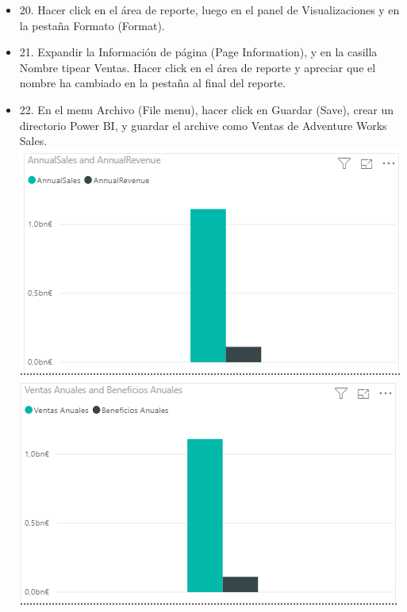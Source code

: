\begin{itemize}
\item 20. Hacer click en el área de reporte, luego en el panel de Visualizaciones y en la pestaña Formato (Format). \\
\item 21. Expandir la Información de página (Page Information), y en la casilla Nombre tipear Ventas. Hacer click en el área de reporte y apreciar que el nombre ha cambiado en la pestaña al final del reporte. \\


\item 22. En el menu Archivo (File menu), hacer click en Guardar (Save), crear un directorio Power BI, y guardar el archive como Ventas de Adventure Works Sales. \\

\includegraphics[scale=0.5]{./Imagenes/image029}
\includegraphics[scale=0.5]{./Imagenes/image030}



\end{itemize}